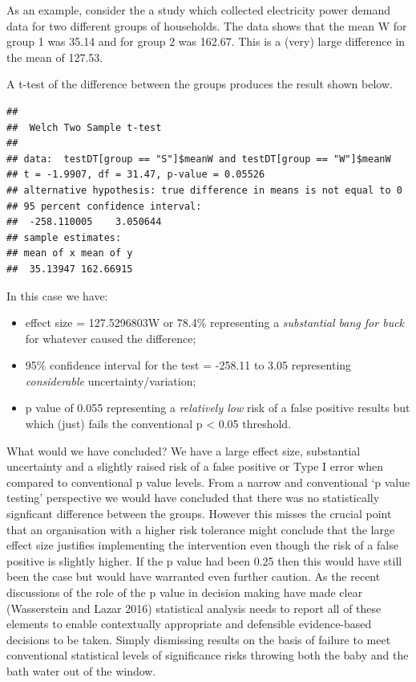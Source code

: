 \documentclass[]{article}
\providecommand{\tightlist}{%
  \setlength{\itemsep}{0pt}\setlength{\parskip}{0pt}}
\theoremstyle{definition}
\theoremstyle{definition}
\theoremstyle{definition}
\theoremstyle{remark}
\begin{document}
As an example, consider the a study which collected electricity power
demand data for two different groups of households. The data shows that
the mean W for group 1 was 35.14 and for group 2 was 162.67. This is a
(very) large difference in the mean of 127.53.

A t-test of the difference between the groups produces the result shown
below.

\begin{verbatim}
## 
##  Welch Two Sample t-test
## 
## data:  testDT[group == "S"]$meanW and testDT[group == "W"]$meanW
## t = -1.9907, df = 31.47, p-value = 0.05526
## alternative hypothesis: true difference in means is not equal to 0
## 95 percent confidence interval:
##  -258.110005    3.050644
## sample estimates:
## mean of x mean of y 
##  35.13947 162.66915
\end{verbatim}

In this case we have:

\begin{itemize}
\tightlist
\item
  effect size = 127.5296803W or 78.4\% representing a \emph{substantial
  bang for buck} for whatever caused the difference;
\item
  95\% confidence interval for the test = -258.11 to 3.05 representing
  \emph{considerable} uncertainty/variation;
\item
  p value of 0.055 representing a \emph{relatively low} risk of a false
  positive results but which (just) fails the conventional p \textless{}
  0.05 threshold.
\end{itemize}

What would we have concluded? We have a large effect size, substantial
uncertainty and a slightly raised risk of a false positive or Type I
error when compared to conventional p value levels. From a narrow and
conventional `p value testing' perspective we would have concluded that
there was no statistically signficant difference between the groups.
However this misses the crucial point that an organisation with a higher
risk tolerance might conclude that the large effect size justifies
implementing the intervention even though the risk of a false positive
is slightly higher. If the p value had been 0.25 then this would have
still been the case but would have warranted even further caution. As
the recent discussions of the role of the p value in decision making
have made clear (Wasserstein and Lazar 2016) statistical analysis needs
to report all of these elements to enable contextually appropriate and
defensible evidence-based decisions to be taken. Simply dismissing
results on the basis of failure to meet conventional statistical levels
of significance risks throwing both the baby and the bath water out of
the window.
\end{document}
